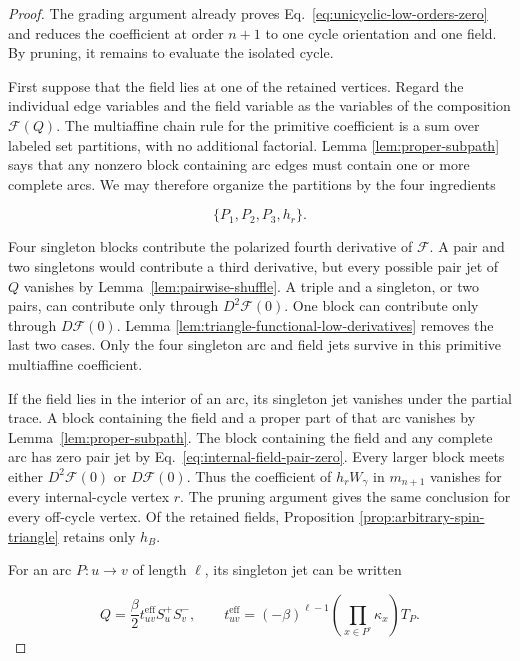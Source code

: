 \begin{proof}
The grading argument already proves
Eq.~\eqref{eq:unicyclic-low-orders-zero} and reduces the coefficient at order
$n+1$ to one cycle orientation and one field.  By pruning, it remains to
evaluate the isolated cycle.

First suppose that the field lies at one of the retained vertices.  Regard
the individual edge variables and the field variable as the variables of
the composition $\mathcal F(Q)$.  The multiaffine chain rule for the
primitive coefficient is a sum over labeled set partitions, with no
additional factorial.  Lemma
\ref{lem:proper-subpath} says that any nonzero block containing arc edges
must contain one or more complete arcs.  We may therefore organize the
partitions by the four ingredients

\begin{equation}
 \{P_1,P_2,P_3,h_r\}.
 \label{eq:four-ingredients}
\end{equation}

Four singleton blocks contribute the polarized fourth derivative of
$\mathcal F$.  A pair and two singletons would contribute a third derivative,
but every possible pair jet of $Q$ vanishes by
Lemma~\ref{lem:pairwise-shuffle}.  A triple and a singleton, or two pairs,
can contribute only through $D^2\mathcal F(0)$.  One block can contribute
only through $D\mathcal F(0)$.  Lemma
\ref{lem:triangle-functional-low-derivatives} removes the last two cases.
Only the four singleton arc and field jets survive in this primitive
multiaffine coefficient.

If the field lies in the interior of an arc, its singleton jet vanishes under
the partial trace.  A block containing the field and a proper part of that
arc vanishes by Lemma~\ref{lem:proper-subpath}.  The block containing the
field and any complete arc has zero pair jet by
Eq.~\eqref{eq:internal-field-pair-zero}.  Every larger block meets either
$D^2\mathcal F(0)$ or $D\mathcal F(0)$.  Thus the coefficient of
$h_rW_\gamma$ in $m_{n+1}$ vanishes for every internal-cycle vertex $r$.
The pruning argument gives the same conclusion for every off-cycle vertex.
Of the retained fields, Proposition
\ref{prop:arbitrary-spin-triangle} retains only $h_B$.

For an arc $P:u\to v$ of length $\ell$, its singleton jet can be written

\begin{equation}
 [P]Q
 =\frac{\beta}{2}t_{uv}^{\mathrm{eff}}S_u^+S_v^-,
 \qquad
 t_{uv}^{\mathrm{eff}}
 =(-\beta)^{\ell-1}
 \left(\prod_{x\in P^\circ}\kappa_x\right)T_P.
 \label{eq:primitive-effective-hopping}
\end{equation}


\end{proof}
